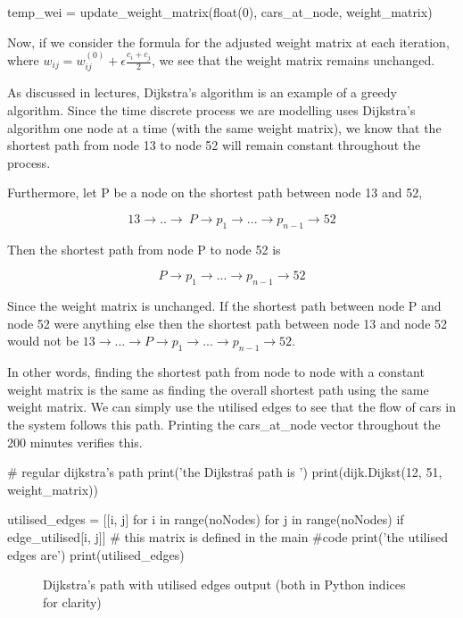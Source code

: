 \documentclass[paper=a4, fontsize=12pt]{scrartcl} %
\numberwithin{equation}{section}       %
\numberwithin{figure}{section}         %
\numberwithin{table}{section}          %
\begin{document}
\begin{enumerate}
\begin{python}
temp_wei = update_weight_matrix(float(0), cars_at_node, weight_matrix)
\end{python}

Now, if we consider the formula for the adjusted weight matrix at each iteration, where $w_{ij} = w_{ij}^{(0)} + \epsilon \frac{c_{i} + c_{j}}{2}$, we see that the weight matrix remains unchanged.

As discussed in lectures, Dijkstra's algorithm is an example of a greedy algorithm. Since the time discrete process we are modelling uses Dijkstra's algorithm one node at a time (with the same weight matrix), we know that the shortest path from node 13 to node 52 will remain constant throughout the process.

Furthermore, let P be a node on the shortest path between node 13 and 52,

$$ 13 \to .. \to \ P \to p_{1} \to ... \to p_{n-1} \to 52 $$

Then the shortest path from node P to node 52 is 

$$ P \to p_{1} \to ... \to p_{n-1} \to 52 $$

Since the weight matrix is unchanged. If the shortest path between node P and node 52 were anything else then the shortest path between node 13 and node 52 would not be $13 \to ... \to P \to p_{1} \to ... \to p_{n-1} \to 52$.

In other words, finding the shortest path from node to node with a constant weight matrix is the same as finding the overall shortest path using the same weight matrix. We can simply use the utilised edges to see that the flow of cars in the system follows this path. Printing the cars\_at\_node vector throughout the 200 minutes verifies this.

\begin{python}
# regular dijkstra's path
print('the Dijkstra\'s path is ')
print(dijk.Dijkst(12, 51, weight_matrix))

utilised_edges = [[i, j] for i in range(noNodes) 
                  for j in range(noNodes) 
                  if edge_utilised[i, j]] # this matrix is defined in the main 
                  			       #code
print('the utilised edges are')
print(utilised_edges)
\end{python}

\begin{figure}[h]
\caption{Dijkstra's path with utilised edges output (both in Python indices for clarity)}
\centering


\end{figure}
\end{enumerate}
\end{document}
